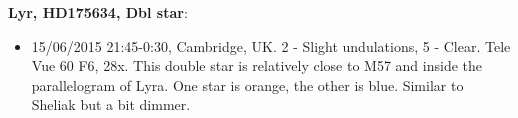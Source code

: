 {\bf Lyr, HD175634, Dbl star}:
\begin{itemize}
\item 15/06/2015 21:45-0:30, Cambridge, UK. 2 - Slight undulations, 5 - Clear. Tele Vue 60 F6, 28x. This double star is relatively close to M57 and inside the parallelogram of Lyra. One star is orange, the other is blue. Similar to Sheliak but a bit dimmer.
\end{itemize}
